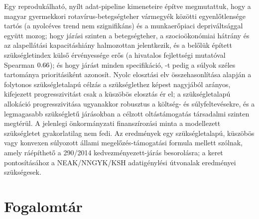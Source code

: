 \documentclass[11pt,a4paper]{article}
\begin{document}
Egy reprodukálható, nyílt adat-pipeline kimeneteire építve megmutattuk, hogy
a magyar gyermekkori rotavírus-betegségteher vármegyék közötti
egyenlőtlensége tartós (a nyolcéves trend nem szignifikáns) és a
munkaerőpiaci depriváltsággal együtt mozog; hogy járási szinten a
betegségteher, a szocioökonómiai hátrány és az alapellátási kapacitáshiány
halmozottan jelentkezik, és a belőlük épített szükségletindex külső
érvényessége erős (a hivatalos fejlettségi mutatóval Spearman
$0.66$); és hogy \nSpecRobust{} járást minden
specifikáció, \nRobustPriority-t pedig a súlyok széles tartománya
prioritásiként azonosít. Nyolc elosztási elv összehasonlítása alapján a
folytonos szükségletalapú célzás a szükséglethez képest nagyjából arányos,
kifejezett progresszivitást csak a küszöbös elosztás ér el; a szükségletalapú
allokáció progresszivitása ugyanakkor robusztus a költség- és
súlyfeltevésekre, és a legmagasabb szükségletű járásokban a célzott
oltástámogatás társadalmi szinten megtérül. A jelenlegi önkormányzati
finanszírozási minta a modellezett szükségletet gyakorlatilag nem fedi. Az
eredmények egy szükségletalapú, küszöbös vagy konvexen súlyozott állami
megelőzés-támogatási formula mellett szólnak, amely ráépíthető a 290/2014
kedvezményezett-járás besorolásra; a keret pontosításához a NEAK/NNGYK/KSH
adatigénylési útvonalak eredményei szükségesek.

\section*{Fogalomtár}
\end{document}
